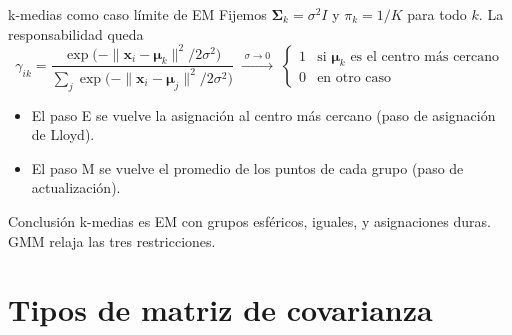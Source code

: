 \documentclass[aspectratio=169,11pt]{beamer}
\newcommand{\x}{\bm{x}}
\newcommand{\muv}{\bm{\mu}}
\newcommand{\Sig}{\bm{\Sigma}}
\begin{document}
\begin{frame}{k-medias como caso límite de EM}
  Fijemos $\Sig_k = \sigma^2 I$ y $\pi_k = 1/K$ para todo $k$. La responsabilidad queda
  \[
    \gamma_{ik} = \frac{\exp\!\big(-\|\x_i-\muv_k\|^2 / 2\sigma^2\big)}{\sum_j \exp\!\big(-\|\x_i-\muv_j\|^2 / 2\sigma^2\big)}
    \;\xrightarrow{\;\sigma \to 0\;}\;
    \begin{cases} 1 & \text{si } \muv_k \text{ es el centro más cercano}\\ 0 & \text{en otro caso}\end{cases}
  \]
  \begin{itemize}
    \item El paso E se vuelve la asignación al centro más cercano (paso de asignación de Lloyd).
    \item El paso M se vuelve el promedio de los puntos de cada grupo (paso de actualización).
  \end{itemize}
  \vspace{4pt}
  \begin{block}{Conclusión}
    k-medias es EM con grupos esféricos, iguales, y asignaciones duras.
    GMM relaja las tres restricciones.
  \end{block}
\end{frame}

\section{Tipos de matriz de covarianza}
\end{document}
